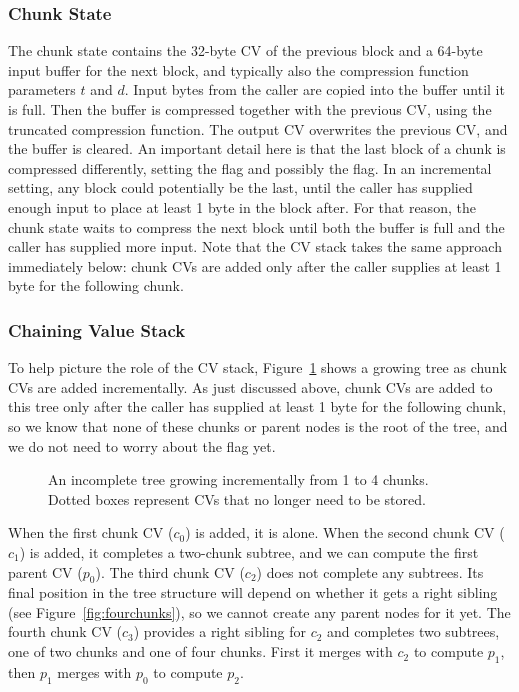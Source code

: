 \documentclass[11pt,notitlepage,a4paper]{article}
\newcommand{\flag}[1]{\texttt{\detokenize{#1}}\xspace}
\begin{document}
\subsubsection{Chunk State}\label{sec:chunkstate}

The chunk state contains the 32-byte CV of the previous block and a 64-byte
input buffer for the next block, and typically also the compression function
parameters $t$ and $d$. Input bytes from the caller are copied into the buffer
until it is full. Then the buffer is compressed together with the previous CV,
using the truncated compression function. The output CV overwrites the previous
CV, and the buffer is cleared. An important detail here is that the last block
of a chunk is compressed differently, setting the \flag{CHUNK_END} flag and
possibly the \flag{ROOT} flag. In an incremental setting, any block could
potentially be the last, until the caller has supplied enough input to place at
least 1 byte in the block after. For that reason, the chunk state waits to
compress the next block until both the buffer is full and the caller has
supplied more input. Note that the CV stack takes the same approach immediately
below: chunk CVs are added only after the caller supplies at least 1 byte for
the following chunk.

\subsubsection{Chaining Value Stack}\label{sec:cvstack}

To help picture the role of the CV stack, Figure~\ref{fig:incrementaltrees}
shows a growing tree as chunk CVs are added incrementally. As just discussed
above, chunk CVs are added to this tree only after the caller has supplied at
least 1 byte for the following chunk, so we know that none of these chunks or
parent nodes is the root of the tree, and we do not need to worry about the
\flag{ROOT} flag yet.

\begin{figure}[h]
\centering

\caption{An incomplete tree growing incrementally from 1 to 4 chunks. Dotted
    boxes represent CVs that no longer need to be stored.}
\label{fig:incrementaltrees}
\end{figure}

When the first chunk CV ($c_0$) is added, it is alone. When the second chunk CV
($c_1$) is added, it completes a two-chunk subtree, and we can compute the
first parent CV ($p_0$). The third chunk CV ($c_2$) does not complete any
subtrees. Its final position in the tree structure will depend on whether it
gets a right sibling (see Figure~\ref{fig:fourchunks}), so we cannot create any
parent nodes for it yet. The fourth chunk CV ($c_3$) provides a right sibling
for $c_2$ and completes two subtrees, one of two chunks and one of four chunks.
First it merges with $c_2$ to compute $p_1$, then $p_1$ merges with $p_0$ to
compute $p_2$.
\end{document}

